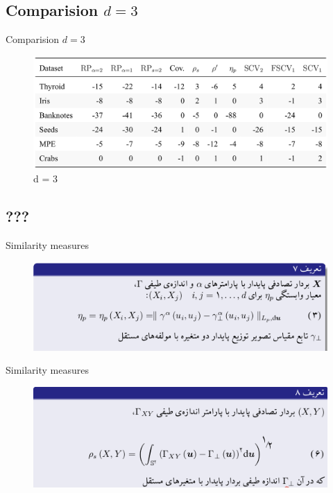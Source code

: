 \documentclass[ignorenonframetext,]{beamer}
\begin{document}
\subsection{\texorpdfstring{Comparision
\(d = 3\)}{Comparision d = 3}}\label{comparision-d-3}

\begin{frame}{Comparision \(d = 3\)}

\begin{figure}
\centering
\includegraphics{pics/02.png}
\caption{d = 3}
\end{figure}

\end{frame}

\subsection{???}\label{section}

\begin{frame}{Similarity measures}

\begin{figure}
\centering
\includegraphics{pics/08-1.png}
\caption{}
\end{figure}

\end{frame}

\begin{frame}{Similarity measures}

\begin{figure}
\centering
\includegraphics{pics/08-2.png}
\caption{}
\end{figure}

\end{frame}
\end{document}
